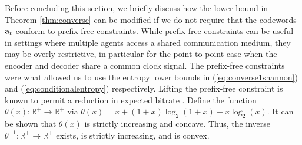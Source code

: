 \documentclass[letterpaper, 10 pt, conference]{ieeeconf}  %
\newcounter{constraint}[section]
\newcommand{\rs}[1]{\mathbf{\MakeLowercase{#1}}}
\begin{document}
Before concluding this section, we briefly discuss how the lower bound in Theorem \ref{thm:converse} can be modified if we do not require that the codewords $\rs{a}_{t}$ conform to prefix-free constraints.  While prefix-free constraints can be useful in settings where multiple agents access a shared communication medium, they may be overly restrictive, in particular for the point-to-point case when the encoder and decoder share a common clock signal. The prefix-free constraints were what allowed us to use the entropy lower bounds in (\ref{eq:converse1shannon}) and (\ref{eq:conditionalentropy}) respectively. Lifting the prefix-free constraint is known to permit a reduction in expected bitrate \cite{kostinaTradeoff} \cite{verduVariableLength}. Define the function $\theta(x):\mathbb{R}^{+}\rightarrow\mathbb{R}^{+}$ via $\theta(x) = x+(1+x)\log_2(1+x)-x\log_2(x)$. It can be shown that $\theta(x)$ is strictly increasing and concave. Thus, the inverse $\theta^{-1}:\mathbb{R}^{+}\rightarrow\mathbb{R}^{+}$ exists, is strictly increasing, and is convex. 
\end{document}
